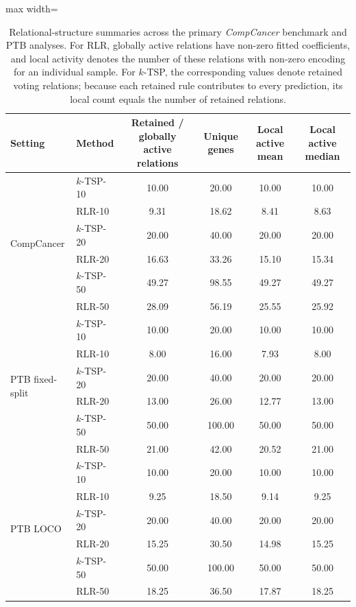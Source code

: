 \documentclass[preprint,12pt,a4paper]{elsarticle}
\begin{document}
\begin{table}[t]
\centering
\caption{Relational-structure summaries across the primary \emph{CompCancer} benchmark and PTB analyses. For RLR, globally active relations have non-zero fitted coefficients, and local activity denotes the number of these relations with non-zero encoding for an individual sample. For $k$-TSP, the corresponding values denote retained voting relations; because each retained rule contributes to every prediction, its local count equals the number of retained relations.}
\label{tab:world_structure}
\small
\setlength{\tabcolsep}{6pt}
\begin{adjustbox}{max width=\linewidth}
\begin{tabular}{llcccc}
\toprule
\textbf{Setting} & \textbf{Method} &
\textbf{Retained / globally active relations} &
\textbf{Unique genes} &
\textbf{Local active mean} &
\textbf{Local active median} \\
\midrule
\multirow{6}{*}{CompCancer}
& $k$-TSP-10 & 10.00 & 20.00 & 10.00 & 10.00 \\
& RLR-10     & 9.31  & 18.62 & 8.41  & 8.63 \\
& $k$-TSP-20 & 20.00 & 40.00 & 20.00 & 20.00 \\
& RLR-20     & 16.63 & 33.26 & 15.10 & 15.34 \\
& $k$-TSP-50 & 49.27 & 98.55 & 49.27 & 49.27 \\
& RLR-50     & 28.09 & 56.19 & 25.55 & 25.92 \\
\midrule
\multirow{6}{*}{PTB fixed-split}
& $k$-TSP-10 & 10.00 & 20.00 & 10.00 & 10.00 \\
& RLR-10     & 8.00  & 16.00 & 7.93  & 8.00 \\
& $k$-TSP-20 & 20.00 & 40.00 & 20.00 & 20.00 \\
& RLR-20     & 13.00 & 26.00 & 12.77 & 13.00 \\
& $k$-TSP-50 & 50.00 & 100.00 & 50.00 & 50.00 \\
& RLR-50     & 21.00 & 42.00 & 20.52 & 21.00 \\
\midrule
\multirow{6}{*}{PTB LOCO}
& $k$-TSP-10 & 10.00 & 20.00 & 10.00 & 10.00 \\
& RLR-10     & 9.25  & 18.50 & 9.14  & 9.25 \\
& $k$-TSP-20 & 20.00 & 40.00 & 20.00 & 20.00 \\
& RLR-20     & 15.25 & 30.50 & 14.98 & 15.25 \\
& $k$-TSP-50 & 50.00 & 100.00 & 50.00 & 50.00 \\
& RLR-50     & 18.25 & 36.50 & 17.87 & 18.25 \\
\bottomrule
\end{tabular}
\end{adjustbox}
\end{table}
\end{document}
